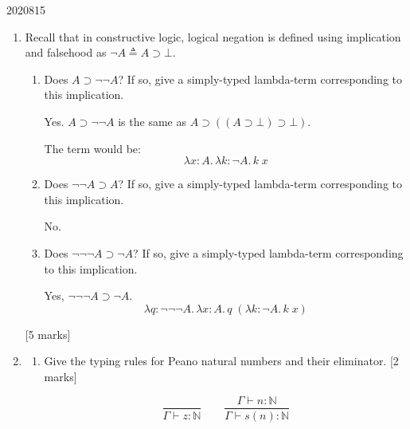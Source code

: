 \documentclass[10pt,\jkfside,a4paper]{article}
\newcommand{\answer}[1]{
    \begin{tcolorbox}[colframe=black, colback=white, sharp corners, boxrule=0.2mm, breakable]
        #1
    \end{tcolorbox}
}
\newcommand{\qmarks}[1]{\hspace*{\fill}[#1]}
\begin{document}
\begin{examquestion}{2020}{8}{15}
    \begin{enumerate}
        \item
            Recall that in constructive logic, logical negation is defined using
            implication and falsehood as $\neg A \triangleq A \supset \bot$.

            \begin{enumerate}
                \item
                    Does $A \supset \neg\neg A$? If so, give a simply-typed lambda-term
                    corresponding to this implication.

                    \answer{
                        Yes. $A \supset \neg\neg A$ is the same as $A \supset ((A \supset \bot) \supset \bot)$.

                        The term would be:
                        \[
                            \lambda x : A.\, \lambda k : \neg A.\, k\;x
                        \]
                    }

                \item
                    Does $\neg\neg A \supset A$? If so, give a simply-typed lambda-term
                    corresponding to this implication.

                    \answer{
                        No.
                    }

                \item
                    Does $\neg\neg\neg A \supset \neg A$? If so, give a simply-typed
                    lambda-term corresponding to this implication.

                    \answer{
                        Yes, $\neg\neg\neg A \supset \neg A$.
                        \[
                            \lambda q : \neg\neg\neg A.\, \lambda x : A.\, q\;(\lambda k : \neg A.\, k\;x)
                        \]
                    }

            \end{enumerate}

            \qmarks{5 marks}

        \item
            \begin{enumerate}
                \item
                    Give the typing rules for Peano natural numbers and their eliminator.
                    \qmarks{2 marks}

                    \answer{
                        \[
                            \frac{}{\Gamma \vdash z : \mathbb{N}}
                            \qquad
                            \frac{\Gamma \vdash n : \mathbb{N}}{\Gamma \vdash s(n) : \mathbb{N}}
                        \]

}
\end{enumerate}
\end{enumerate}
\end{examquestion}
\end{document}
